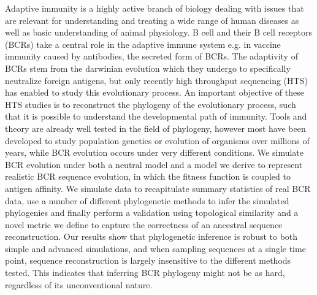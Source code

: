 % 
% 
%
Adaptive immunity is a highly active branch of biology dealing with issues that are relevant for understanding and treating a wide range of human diseases as well as basic understanding of animal physiology.
B cell and their B cell receptors (BCRs) take a central role in the adaptive immune system e.g. in vaccine immunity caused by antibodies, the secreted form of BCRs.
The adaptivity of BCRs stem from the darwinian evolution which they undergo to specifically neutralize foreign antigens, but only recently high throughput sequencing (HTS) has enabled to study this evolutionary process.
An important objective of these HTS studies is to reconstruct the phylogeny of the evolutionary process, such that it is possible to understand the developmental path of immunity.
Tools and theory are already well tested in the field of phylogeny, however most have been developed to study population genetics or evolution of organisms over millions of years, while BCR evolution occurs under very different conditions.
We simulate BCR evolution under both a neutral model and a model we derive to represent realistic BCR sequence evolution, in which the fitness function is coupled to antigen affinity.
We simulate data to recapitulate summary statistics of real BCR data, use a number of different phylogenetic methods to infer the simulated phylogenies and finally perform a validation using topological similarity and a novel metric we define to capture the correctness of an ancestral sequence reconstruction.
Our results show that phylogenetic inference is robust to both simple and advanced simulations, and when sampling sequences at a single time point, sequence reconstruction is largely insensitive to the different methods tested.
This indicates that inferring BCR phylogeny might not be as hard, regardless of its unconventional nature.
